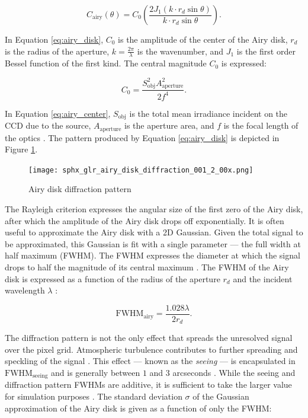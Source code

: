 \begin{equation} \label{eq:airy_disk}
  C_\mathrm{airy}(\theta) = C_0 \left( \frac{2 J_1(k \cdot r_d \sin\theta)}{k \cdot r_d \sin\theta} \right).
\end{equation}

In Equation \ref{eq:airy_disk}, $C_0$ is the amplitude of the center of the Airy disk, $r_d$ is the radius of the aperture, $k = \frac{2\pi}{\lambda}$ is the wavenumber, and $J_1$ is the first order Bessel function of the first kind. The central magnitude $C_0$ is expressed:

\begin{equation} \label{eq:airy_center}
  C_0 = \frac{S_\mathrm{obj}^2 A_\mathrm{aperture}^2}{2 f^4}.
\end{equation}

In Equation \ref{eq:airy_center}, $S_\mathrm{obj}$ is the total mean irradiance incident on the CCD due to the source, $A_\mathrm{aperture}$ is the aperture area, and $f$ is the focal length of the optics \cite{frueh2019notes}. The pattern produced by Equation \ref{eq:airy_disk} is depicted in Figure \ref{fig:airy_disk_magnitude}.

\begin{figure}[ht]
  \centering
  \texttt{[image: sphx\_glr\_airy\_disk\_diffraction\_001\_2\_00x.png]}
  \caption{Airy disk diffraction pattern}
  \label{fig:airy_disk_magnitude}
\end{figure}

The Rayleigh criterion expresses the angular size of the first zero of the Airy disk, after which the amplitude of the Airy disk drops off exponentially. It is often useful to approximate the Airy disk with a 2D Gaussian. Given the total signal to be approximated, this Gaussian is fit with a single parameter --- the full width at half maximum (FWHM). The FWHM expresses the diameter at which the signal drops to half the magnitude of its central maximum \cite{frueh2019notes}. The FWHM of the Airy disk is expressed as a function of the radius of the aperture $r_d$ and the incident wavelength $\lambda$ \cite{frueh2019notes}:

\begin{equation} \label{eq:fwhm_airy}
  \mathrm{FWHM}_\mathrm{airy} = \frac{1.028 \lambda}{2 r_d}.
\end{equation}

The diffraction pattern is not the only effect that spreads the unresolved signal over the pixel grid. Atmospheric turbulence contributes to further spreading and speckling of the signal \cite{frueh2019notes}. This effect --- known as the \textit{seeing} --- is encapsulated in $\mathrm{FWHM}_\mathrm{seeing}$ and is generally between $1$ and $3$ arcseconds \cite{frueh2019notes}. While the seeing and diffraction pattern FWHMs are additive, it is sufficient to take the larger value for simulation purposes \cite{frueh2019notes}. The standard deviation $\sigma$ of the Gaussian approximation of the Airy disk is given as a function of only the FWHM:

